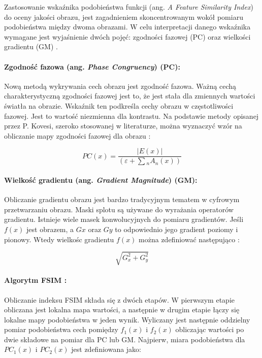 \documentclass{article}
\begin{document}
Zastosowanie wskaźnika podobieństwa funkcji (ang. \emph{A Feature Similarity Index}) do oceny jakości obrazu, 
jest zagadnieniem skoncentrowanym wokół pomiaru podobieństwa między dwoma obrazami.
W celu interpretacji danego wskaźnika wymagane jest wyjaśnienie dwóch pojęć: zgodności fazowej (PC) oraz wielkości gradientu (GM) \cite{fsim_theory}.

\paragraph{Zgodność fazowa (ang. \emph{Phase Congruency}) (PC):}
Nową metodą wykrywania cech obrazu jest zgodność fazowa. Ważną cechą charakterystyczną zgodności fazowej jest to,
że jest stała dla zmiennych wartości światła na obrazie. Wskaźnik ten podkreśla cechy obrazu w częstotliwości fazowej. 
Jest to wartość niezmienna dla kontrastu. Na podstawie metody opisanej przez P. Kovesi, szeroko stosowanej w literaturze, 
można wyznaczyć wzór na obliczanie mapy zgodności fazowej dla obrazu \cite{pc}:

\begin{equation}
  PC(x) = \frac{|E(x)|}{(\varepsilon + \sum\limits{_{n}} A_n(x))}
\end{equation}

\paragraph{Wielkość gradientu  (ang. \emph{Gradient Magnitude}) (GM):}
Obliczanie gradientu obrazu jest bardzo tradycyjnym tematem w cyfrowym przetwarzaniu obrazu. 
Maski splotu są używane do wyrażania operatorów gradientu. Istnieje wiele masek konwolucyjnych do pomiaru gradientów. 
Jeśli $f(x)$ jest obrazem, a $Gx$ oraz $Gy$ to odpowiednio jego gradient poziomy i pionowy. 
Wtedy wielkośc gradientu $f(x)$ można zdefiniować następująco \cite{gm}:

\begin{equation}
  \sqrt{G^2_x+G^2_y}
\end{equation}

\paragraph{Algorytm FSIM \cite{fsim_alg}:}
Obliczanie indeksu FSIM składa się z dwóch etapów. 
W pierwszym etapie obliczana jest lokalna mapa wartości, a następnie w drugim etapie łączy się lokalne mapy podobieństwa w jeden wynik.
Wyliczany jest następnie oddzielny pomiar podobieństwa cech pomiędzy $f_1(x)$ i $f_2(x)$ obliczając wartości po dwie 
składowe na pomiar dla PC lub GM. Najpierw, miara podobieństwa dla $PC_1 (x)$ i $PC_2(x)$ jest zdefiniowana jako:
\end{document}
